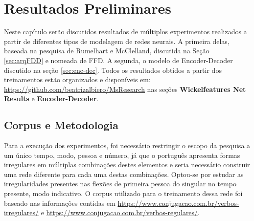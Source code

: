 \chapter{Resultados Preliminares}
\label{ch:03-results}


Neste capítulo serão discutidos resultados de múltiplos experimentos realizados a partir de diferentes tipos de modelagem de redes neurais. A primeira delas, baseada na pesquisa de Rumelhart e McClelland, discutida na Seção \ref{sec:arqFDD} e nomeada de FFD.
A segunda, o modelo de Encoder-Decoder discutido na seção \ref{sec:enc-dec}. Todos os resultados obtidos a partir dos treinamentos estão organizados e disponíveis em: 
\url{https://github.com/beatrizalbiero/MsResearch} nas seções \textbf{Wickelfeatures Net Results} e \textbf{Encoder-Decoder}.


\section{Corpus e Metodologia}
\label{sec:corpus-ffd}

Para a execução dos experimentos, foi necessário restringir o escopo da pesquisa a um único tempo, modo, pessoa e número, já que o português apresenta formas irregulares em múltiplas combinações destes elementos e seria necessário construir uma rede diferente para cada uma destas combinações. Optou-se por estudar as irregularidades presentes nas flexões de primeira pessoa do singular no tempo presente, modo indicativo.  
O corpus utilizado para o treinamento dessa rede foi baseado nas informações contidas em \url{https://www.conjugacao.com.br/verbos-irregulares/} e \url{https://www.conjugacao.com.br/verbos-regulares/}.\\

